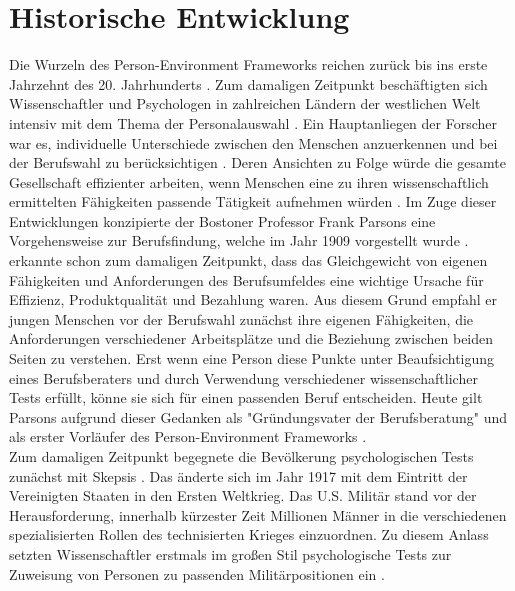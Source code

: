 \section{Historische Entwicklung}
\label{ch:personEnvironmentFit:historisches}
Die Wurzeln des Person-Environment Frameworks reichen zurück bis ins erste Jahrzehnt des 20. Jahrhunderts \cite[S. 1]{su:2015}. Zum damaligen Zeitpunkt beschäftigten sich Wissenschaftler und Psychologen in zahlreichen Ländern der westlichen Welt intensiv mit dem Thema der Personalauswahl \cite[S. 1]{salgado:2001}. Ein Hauptanliegen der Forscher war es, individuelle Unterschiede zwischen den Menschen anzuerkennen und bei der Berufswahl zu berücksichtigen \cite[S. 2ff.]{stern:1900}. Deren Ansichten zu Folge würde die gesamte Gesellschaft effizienter arbeiten, wenn Menschen eine zu ihren wissenschaftlich ermittelten Fähigkeiten passende Tätigkeit aufnehmen würden \cite[S.2]{kevles:1968}\cite[S. 3]{parsons:1909}. Im Zuge dieser Entwicklungen konzipierte der Bostoner Professor Frank Parsons eine Vorgehensweise zur Berufsfindung, welche im Jahr 1909 vorgestellt wurde \cite[S. 1]{su:2015}. \textcite[S. 5ff.]{parsons:1909} erkannte schon zum damaligen Zeitpunkt, dass das Gleichgewicht von eigenen Fähigkeiten und Anforderungen des Berufsumfeldes eine wichtige Ursache für Effizienz, Produktqualität und Bezahlung waren. Aus diesem Grund empfahl er jungen Menschen vor der Berufswahl zunächst ihre eigenen Fähigkeiten, die Anforderungen verschiedener Arbeitsplätze und die Beziehung zwischen beiden Seiten zu verstehen. Erst wenn eine Person diese Punkte unter Beaufsichtigung eines Berufsberaters und durch Verwendung verschiedener wissenschaftlicher Tests erfüllt, könne sie sich für einen passenden Beruf entscheiden. Heute gilt Parsons aufgrund dieser Gedanken als "Gründungsvater der Berufsberatung" \cite[S. 3]{porfeli:2009} und als erster Vorläufer des Person-Environment Frameworks \cite[S. 2]{edwards:2008}.\\
Zum damaligen Zeitpunkt begegnete die Bevölkerung psychologischen Tests zunächst mit Skepsis \cite[S. 2]{kevles:1968}. Das änderte sich im Jahr 1917 mit dem Eintritt der Vereinigten Staaten in den Ersten Weltkrieg. Das U.S. Militär stand vor der Herausforderung, innerhalb kürzester Zeit Millionen Männer in die verschiedenen spezialisierten Rollen des technisierten Krieges einzuordnen. Zu diesem Anlass setzten Wissenschaftler erstmals im großen Stil psychologische Tests zur Zuweisung von Personen zu passenden Militärpositionen ein \cite[S. 2ff.]{kevles:1968}. \\
